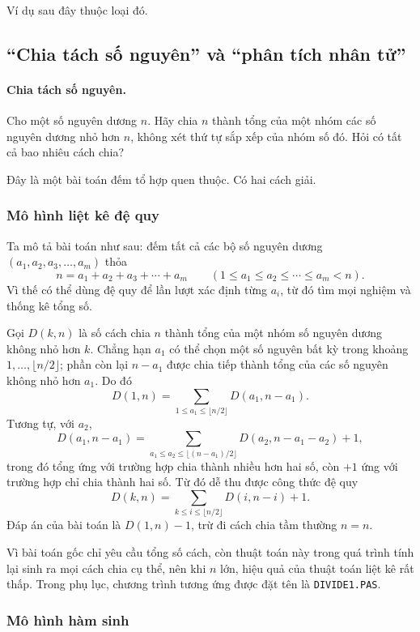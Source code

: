 \documentclass[11pt]{article}
\begin{document}
Ví dụ sau đây thuộc loại đó.

\subsection*{``Chia tách số nguyên'' và ``phân tích nhân tử''}

\paragraph{Chia tách số nguyên.}
Cho một số nguyên dương \(n\). Hãy chia \(n\) thành tổng của một nhóm các số
nguyên dương nhỏ hơn \(n\), không xét thứ tự sắp xếp của nhóm số đó. Hỏi có
tất cả bao nhiêu cách chia?~\cite{algorithm-design}

Đây là một bài toán đếm tổ hợp quen thuộc. Có hai cách giải.

\subsubsection*{Mô hình liệt kê đệ quy}

Ta mô tả bài toán như sau: đếm tất cả các bộ số nguyên dương
\((a_1,a_2,a_3,\ldots,a_m)\) thỏa
\[
  n=a_1+a_2+a_3+\cdots+a_m
  \qquad (1\le a_1\le a_2\le \cdots \le a_m<n).
\]
Vì thế có thể dùng đệ quy để lần lượt xác định từng \(a_i\), từ đó tìm mọi
nghiệm và thống kê tổng số.

Gọi \(D(k,n)\) là số cách chia \(n\) thành tổng của một nhóm số nguyên dương
không nhỏ hơn \(k\). Chẳng hạn \(a_1\) có thể chọn một số nguyên bất kỳ trong
khoảng \(1,\ldots,\lfloor n/2\rfloor\); phần còn lại \(n-a_1\) được chia tiếp
thành tổng của các số nguyên không nhỏ hơn \(a_1\). Do đó
\[
  D(1,n)=\sum_{1\le a_1\le \lfloor n/2\rfloor}
          D(a_1,n-a_1).
\]
Tương tự, với \(a_2\),
\[
  D(a_1,n-a_1)=
  \sum_{a_1\le a_2\le \lfloor (n-a_1)/2\rfloor}
  D(a_2,n-a_1-a_2)+1,
\]
trong đó tổng ứng với trường hợp chia thành nhiều hơn hai số, còn \(+1\) ứng
với trường hợp chỉ chia thành hai số. Từ đó dễ thu được công thức đệ quy
\[
  D(k,n)=\sum_{k\le i\le \lfloor n/2\rfloor} D(i,n-i)+1.
\]
Đáp án của bài toán là \(D(1,n)-1\), trừ đi cách chia tầm thường \(n=n\).

Vì bài toán gốc chỉ yêu cầu tổng số cách, còn thuật toán này trong quá trình
tính lại sinh ra mọi cách chia cụ thể, nên khi \(n\) lớn, hiệu quả của thuật
toán liệt kê rất thấp. Trong phụ lục, chương trình tương ứng được đặt tên là
\texttt{DIVIDE1.PAS}.

\subsubsection*{Mô hình hàm sinh}
\end{document}
